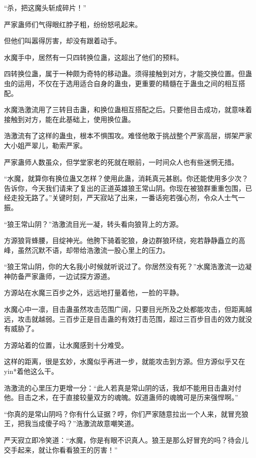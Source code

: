 \begin{this_body}
“杀，把这魔头斩成碎片！”

严家蛊师们气得眼红脖子粗，纷纷怒吼起来。

但他们叫嚣得厉害，却没有跟着动手。

水魔手中，居然有一只四转换位蛊，这超出了他们的预料。

四转换位蛊，属于一种颇为奇特的移动蛊。须得接触到对方，才能交换位置。但蛊虫的运用，不仅在于选用适合自身的蛊虫，更重要的精髓在于蛊虫之间的相互搭配。

水魔浩激流用了三转目击蛊，和换位蛊相互搭配之后。只要他目击成功，就意味着接触到对方，能在此基础上，使用换位蛊。

浩激流有了这样的蛊虫，根本不惧围攻。难怪他敢于挑战整个严家高层，绑架严家大小姐严翠儿，勒索严家。

严家蛊师人数虽众，但学堂家老的死就在眼前，一时间众人也有些迷惘无措。

“水魔，就算你有换位蛊又怎样？使用此蛊，消耗真元甚剧。你还能使用多少次？告诉你，今天我们请来了复出的正道英雄狼王常山阴。你现在被狼群重重包围，已经走投无路了。”关键时刻，严天寂站了出来，一番话宛若强心剂，令众人士气一振。

“狼王常山阴？”浩激流目光一凝，转头看向狼背上的方源。

方源狼背蜂腰，目绽神光。他胯下骑着驼狼，身边群狼环绕，宛若静静矗立的高峰，虽然沉默不语，却带给浩激流一股心里上的压力。

“狼王常山阴，你的大名我小时候就听说过了。你居然没有死？”水魔浩激流一边凝神防备严家蛊师，一边试探方源道。

方源站在水魔三百步之外，远远地打量着他，一脸的平静。

水魔心中一凛，目击蛊虽然攻击范围广阔，只要目光所及之处都能攻击，但距离越远，攻击就越弱。三百步正是目击蛊的有效打击范围，超过三百步目击的效力就没有威胁了。

方源站着的位置，让水魔感到十分难受。

这样的距离，很是玄妙，水魔似乎再进一步，就能攻击到方源。但方源似乎又在yin*着他这么干。

浩激流的心里压力更增一分：“此人若真是常山阴的话，我却不能用目击蛊对付他。目击之术，在于直接较量双方的魂魄。奴道蛊师的魂魄可是历来强悍啊。”

“你真的是常山阴吗？你有什么证据？哼，你们严家随意拉出一个人来，就冒充狼王，把我当成傻子吗？”浩激流故意嘲笑道。

严天寂立即冷笑道：“水魔，你是有眼不识真人。狼王是那么好冒充的吗？待会儿交手起来，就让你看看狼王的厉害！”


\end{this_body}
